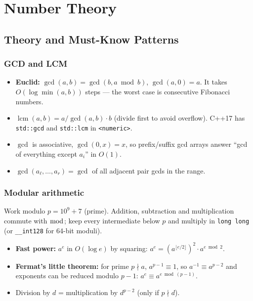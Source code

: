 \chapter{Number Theory}

\section{Theory and Must-Know Patterns}
\label{sec:nt-theory}

\subsection*{GCD and LCM}

\begin{itemize}
  \item \textbf{Euclid:} $\gcd(a,b)=\gcd(b,a\bmod b)$, $\gcd(a,0)=a$. It takes
        $O(\log\min(a,b))$ steps --- the worst case is consecutive Fibonacci
        numbers.
  \item $\operatorname{lcm}(a,b)=a/\gcd(a,b)\cdot b$ (divide first to avoid
        overflow). C++17 has \texttt{std::gcd} and \texttt{std::lcm} in
        \texttt{<numeric>}.
  \item $\gcd$ is associative, $\gcd(0,x)=x$, so prefix/suffix gcd arrays
        answer ``gcd of everything except $a_i$'' in $O(1)$.
  \item $\gcd(a_\ell,\dots,a_r)=\gcd$ of all adjacent pair gcds in the range.
\end{itemize}

\subsection*{Modular arithmetic}

Work modulo $p=10^9+7$ (prime). Addition, subtraction and multiplication
commute with $\bmod$; keep every intermediate below $p$ and multiply in
\texttt{long long} (or \texttt{\_\_int128} for 64-bit moduli).

\begin{itemize}
  \item \textbf{Fast power:} $a^e$ in $O(\log e)$ by squaring:
        $a^e=(a^{\lfloor e/2\rfloor})^2\cdot a^{e\bmod2}$.
  \item \textbf{Fermat's little theorem:} for prime $p\nmid a$,
        $a^{p-1}\equiv1$, so $a^{-1}\equiv a^{p-2}$ and exponents can be
        reduced modulo $p-1$: $a^e\equiv a^{e\bmod(p-1)}$.
  \item Division by $d$ = multiplication by $d^{p-2}$ (only if $p\nmid d$).
\end{itemize}

